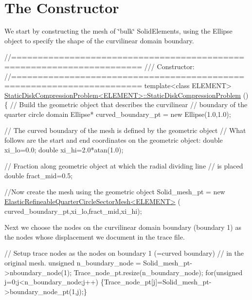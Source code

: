  

\hypertarget{index_constructor}{}\section{The Constructor}\label{index_constructor}
We start by constructing the mesh of \char`\"{}bulk\char`\"{} {\ttfamily Solid\+Elements}, using the {\ttfamily Ellipse} object to specify the shape of the curvilinear domain boundary.


\begin{DoxyCodeInclude}

\textcolor{comment}{//====================================================================== }\textcolor{comment}{}
\textcolor{comment}{/// Constructor: }
\textcolor{comment}{}\textcolor{comment}{//====================================================================== }
\textcolor{keyword}{template}<\textcolor{keyword}{class} ELEMENT>
\hyperlink{classStaticDiskCompressionProblem_a462e81aec225a5d6204b579719b3db87}{StaticDiskCompressionProblem<ELEMENT>::StaticDiskCompressionProblem}
      () 
\{
 \textcolor{comment}{// Build the geometric object that describes the curvilinear}
 \textcolor{comment}{// boundary of the quarter circle domain}
 Ellipse* curved\_boundary\_pt = \textcolor{keyword}{new} Ellipse(1.0,1.0);

 \textcolor{comment}{// The curved boundary of the mesh is defined by the geometric object}
 \textcolor{comment}{// What follows are the start and end coordinates on the geometric object:}
 \textcolor{keywordtype}{double} xi\_lo=0.0;
 \textcolor{keywordtype}{double} xi\_hi=2.0*atan(1.0);

 \textcolor{comment}{// Fraction along geometric object at which the radial dividing line}
 \textcolor{comment}{// is placed}
 \textcolor{keywordtype}{double} fract\_mid=0.5;

 \textcolor{comment}{//Now create the mesh using the geometric object}
 Solid\_mesh\_pt = \textcolor{keyword}{new} \hyperlink{classElasticRefineableQuarterCircleSectorMesh}{ElasticRefineableQuarterCircleSectorMesh<ELEMENT>}
      (
  curved\_boundary\_pt,xi\_lo,fract\_mid,xi\_hi);

\end{DoxyCodeInclude}


Next we choose the nodes on the curvilinear domain boundary (boundary 1) as the nodes whose displacement we document in the trace file.


\begin{DoxyCodeInclude}

 \textcolor{comment}{// Setup trace nodes as the nodes on boundary  1 (=curved boundary) }
 \textcolor{comment}{// in the original mesh.}
 \textcolor{keywordtype}{unsigned} n\_boundary\_node = Solid\_mesh\_pt->nboundary\_node(1);
 Trace\_node\_pt.resize(n\_boundary\_node);
 \textcolor{keywordflow}{for}(\textcolor{keywordtype}{unsigned} j=0;j<n\_boundary\_node;j++)
  \{Trace\_node\_pt[j]=Solid\_mesh\_pt->boundary\_node\_pt(1,j);\}

\end{DoxyCodeInclude}


